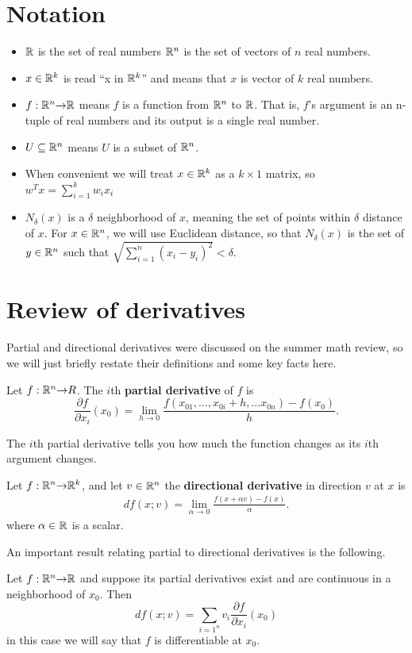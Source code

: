\section{Notation \label{sec:notation}}
\begin{itemize}
\item $\mathbb{R}$ is the set of real numbers $\mathbb{R}^n$ is the set of
  vectors of $n$ real numbers.
\item $x \in \mathbb{R}^k$ is read ``x in $\mathbb{R}^k$'' and means that $x$ is
  vector of $k$ real numbers.
\item $f: \mathbb{R}^n {\rightarrow} \mathbb{R}$ means $f$ is a function from $\mathbb{R}^n$ to
  $\mathbb{R}$. That is, $f$'s argument is an n-tuple of real numbers and
  its output is a single real number.
\item $U \subseteq \mathbb{R}^n$ means $U$ is a subset of $\mathbb{R}^n$. 
\item When convenient we will treat $x \in \mathbb{R}^k$ as a $k \times 1$
  matrix, so $w^T x = \sum_{i=1}^k w_i x_i$
\item $N_\delta(x)$ is a $\delta$ neighborhood of $x$, meaning the set
  of points within $\delta$ distance of $x$. For $x \in \mathbb{R}^n$, we will
  use Euclidean distance, so that $N_\delta(x)$ is the set of $y \in
  \mathbb{R}^n$ such that $\sqrt{\sum_{i=1}^n (x_i - y_i)^2} < \delta$.
\end{itemize}


\section{Review of derivatives \label{sec:derivatives}}
Partial and directional derivatives were discussed on the summer math
review, so we will just briefly restate their definitions and some key
facts here.
\begin{definition}
  Let $f:\mathbb{R}^n {\rightarrow} R$. The $i$th \textbf{partial derivative} of $f$
  is
  \[ \frac{\partial f}{\partial x_i} (x_0) = \lim_{h \to 0}
  \frac{f(x_{01},...,x_{0i}+h, ... x_{0n}) - f(x_0) }{h}. \]
\end{definition}
The $i$th partial derivative tells you how much the function changes
as its $i$th argument changes. 
\begin{definition}
  Let $f: \mathbb{R}^n {\rightarrow} \mathbb{R}^k$, and let $v \in \mathbb{R}^n$ the \textbf{directional
    derivative} in direction $v$ at $x$ is
  \begin{align*}
    df(x;v) = \lim_{\alpha \to 0} \frac{f(x + \alpha v) - f(x)}{\alpha}.
  \end{align*}  
  where $\alpha \in \mathbb{R}$ is a scalar.
\end{definition}
An important result relating partial to directional derivatives is the
following.
\begin{theorem}\label{thm:pddiff}
  Let $f:\mathbb{R}^n {\rightarrow} \mathbb{R}$ and suppose its partial derivatives exist and
  are continuous in a neighborhood of $x_0$. Then
  \[ df(x;v) = \sum_{i=1^n} v_i \frac{\partial f}{\partial x_i}
  (x_0) \]
  in this case we will say that $f$ is differentiable at $x_0$.
\end{theorem}

